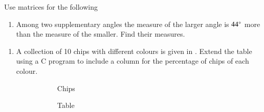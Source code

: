 Use matrices for the following
\begin{enumerate}[label=\thesubsection.\arabic*, ref=\thesubsection.\theenumi,resume*]
\item Among two supplementary angles the measure of the larger angle is $44\degree$  more than the measure of the smaller. Find their measures.
\end{enumerate}
\begin{enumerate}[label=\thesubsection.\arabic*, ref=\thesubsection.\theenumi,resume*]
\item 
	A collection of 10 chips with different colours is given in 
.
Extend the table using a C program
to include a column for the percentage of chips of each colour.
\begin{figure}[H]
  \centering
  \begin{subfigure}{0.25\textwidth}
    
    \caption{Chips}
  \end{subfigure}
  \hfill
\begin{subfigure}{0.4\textwidth}
	  
    \caption{Table}
  \end{subfigure}
  \caption{}
  \label{fig:percent2}
\end{figure}
	\solution 
	
\end{enumerate}
